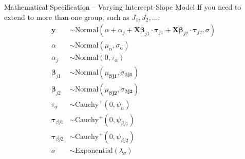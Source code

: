 \begin{frame}{Mathematical Specification -- Varying-Intercept-Slope Model}
	If you need to extend to more than one group,
	such as $J_1, J_2, \dots$:
	$$
		\begin{aligned}
			\mathbf{y}                   & \sim \text{Normal}(\alpha + \alpha_j + \mathbf{X} \boldsymbol{\beta}_{j1} \cdot \boldsymbol{\tau}_{j1} + \mathbf{X} \boldsymbol{\beta}_{j2} \cdot \boldsymbol{\tau}_{j2}, \sigma) \\
			\alpha                       & \sim \text{Normal}(\mu_\alpha, \sigma_\alpha)                                                                                                                                     \\
			\alpha_j                     & \sim \text{Normal}(0, \tau_\alpha)                                                                                                                                                \\
			\boldsymbol{\beta}_{j1}      & \sim \text{Normal}(\mu_{\boldsymbol{\beta j1}}, \sigma_{\boldsymbol{\beta j1}})                                                                                                   \\
			\boldsymbol{\beta}_{j2}      & \sim \text{Normal}(\mu_{\boldsymbol{\beta j2}}, \sigma_{\boldsymbol{\beta j2}})                                                                                                   \\
			\tau_\alpha                  & \sim \text{Cauchy}^+(0, \psi_{\alpha})                                                                                                                                            \\
			\boldsymbol{\tau}_{\beta j1} & \sim \text{Cauchy}^+(0, \psi_{\beta j1})                                                                                                                                          \\
			\boldsymbol{\tau}_{\beta j2} & \sim \text{Cauchy}^+(0, \psi_{\beta j2})                                                                                                                                          \\
			\sigma                       & \sim \text{Exponential}(\lambda_\sigma)
		\end{aligned}
	$$
\end{frame}

